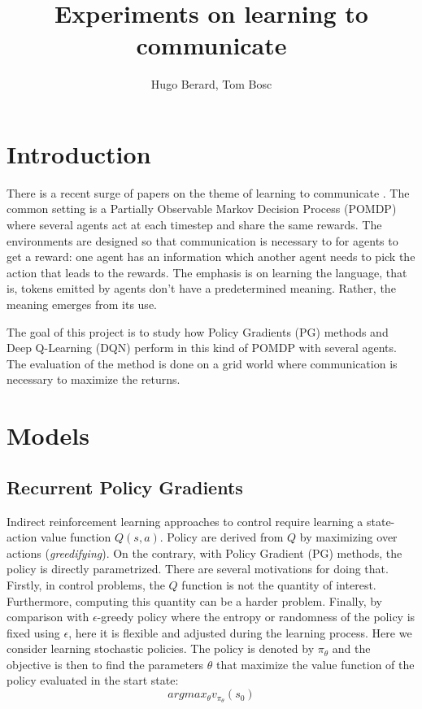 \documentclass{article} %
\title{Experiments on learning to communicate}
\author{
Hugo Berard, Tom Bosc
}
\begin{document}
\maketitle

\section{Introduction}
There is a recent surge of papers on the theme of learning to communicate \cite{sukhbaatar2016learning} \cite{foerster2016learning} \cite{lazaridou2016multi} \cite{mordatch2017emergence}. The common setting is a Partially Observable Markov Decision Process (POMDP) where several agents act at each timestep and share the same rewards. The environments are designed so that communication is necessary to for agents to get a reward: one agent has an information which another agent needs to pick the action that leads to the rewards. The emphasis is on learning the language, that is, tokens emitted by agents don't have a predetermined meaning. Rather, the meaning emerges from its use. 

The goal of this project is to study how Policy Gradients (PG) methods and Deep Q-Learning (DQN) perform in this kind of POMDP with several agents. The evaluation of the method is done on a grid world where communication is necessary to maximize the returns. 

\section{Models}
\subsection{Recurrent Policy Gradients}
Indirect reinforcement learning approaches to control require learning a state-action value function $Q(s,a)$. Policy are derived from $Q$ by maximizing over actions (\textit{greedifying}). On the contrary, with Policy Gradient (PG) methods, the policy is directly parametrized. There are several motivations for doing that\cite{sutton1998reinforcement}. Firstly, in control problems, the $Q$ function is not the quantity of interest. Furthermore, computing this quantity can be a harder problem. Finally, by comparison with $\epsilon$-greedy policy where the entropy or randomness of the policy is fixed using $\epsilon$, here it is flexible and adjusted during the learning process. Here we consider learning stochastic policies. The policy is denoted by $\pi_{\theta}$ and the objective is then to find the parameters $\theta$ that maximize the value function of the policy evaluated in the start state:
$$
argmax_{\theta} v_{\pi_{\theta}}(s_0)
$$
\end{document}
